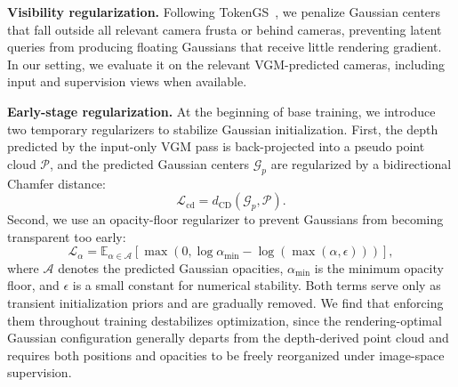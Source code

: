 \documentclass[letterpaper]{article} %
\begin{document}
\noindent\textbf{Visibility regularization.}
Following TokenGS~\cite{ren2026tokengs}, we penalize Gaussian centers that fall outside all relevant camera frusta or behind cameras, preventing latent queries from producing floating Gaussians that receive little rendering gradient. In our setting, we evaluate it on the relevant VGM-predicted cameras, including input and supervision views when available.

\noindent\textbf{Early-stage regularization.}
At the beginning of base training, we introduce two temporary regularizers to stabilize Gaussian initialization. First, the depth predicted by the input-only VGM pass is back-projected into a pseudo point cloud $\mathcal{P}$, and the predicted Gaussian centers $\mathcal{G}_{p}$ are regularized by a bidirectional Chamfer distance:
\begin{equation}
    \mathcal{L}_{\mathrm{cd}}
    =
    d_{\mathrm{CD}}(\mathcal{G}_{p},\mathcal{P}).
\end{equation}
Second, we use an opacity-floor regularizer to prevent Gaussians from becoming transparent too early:
\begin{equation}
    \mathcal{L}_{\alpha}
    =
    \mathbb{E}_{\alpha\in\mathcal{A}}
    \left[
    \max\left(
    0,
    \log \alpha_{\min}
    -
    \log(\max(\alpha,\epsilon))
    \right)
    \right],
\end{equation}
where $\mathcal{A}$ denotes the predicted Gaussian opacities, $\alpha_{\min}$ is the minimum opacity floor, and $\epsilon$ is a small constant for numerical stability. Both terms serve only as transient initialization priors and are gradually removed. We find that enforcing them throughout training destabilizes optimization, since the rendering-optimal Gaussian configuration generally departs from the depth-derived point cloud and requires both positions and opacities to be freely reorganized under image-space supervision.

\end{document}
